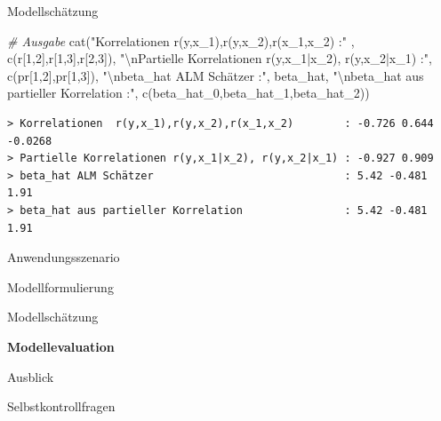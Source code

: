 \documentclass[
  8pt,
  ignorenonframetext,
]{beamer}
\newenvironment{Shaded}{\begin{snugshade}}{\end{snugshade}}
\newcommand{\CommentTok}[1]{\textcolor[rgb]{0.56,0.35,0.01}{\textit{#1}}}
\newcommand{\DecValTok}[1]{\textcolor[rgb]{0.00,0.00,0.81}{#1}}
\newcommand{\FunctionTok}[1]{\textcolor[rgb]{0.00,0.00,0.00}{#1}}
\newcommand{\NormalTok}[1]{#1}
\newcommand{\SpecialCharTok}[1]{\textcolor[rgb]{0.00,0.00,0.00}{#1}}
\newcommand{\StringTok}[1]{\textcolor[rgb]{0.31,0.60,0.02}{#1}}
\begin{document}
\begin{frame}[fragile]{Modellschätzung}
\begin{Shaded}
\begin{Highlighting}[]
\CommentTok{\# Ausgabe}
\FunctionTok{cat}\NormalTok{(}\StringTok{"Korrelationen  r(y,x\_1),r(y,x\_2),r(x\_1,x\_2)        :"}\NormalTok{  , }\FunctionTok{c}\NormalTok{(r[}\DecValTok{1}\NormalTok{,}\DecValTok{2}\NormalTok{],r[}\DecValTok{1}\NormalTok{,}\DecValTok{3}\NormalTok{],r[}\DecValTok{2}\NormalTok{,}\DecValTok{3}\NormalTok{]),}
    \StringTok{"}\SpecialCharTok{\textbackslash{}n}\StringTok{Partielle Korrelationen r(y,x\_1|x\_2), r(y,x\_2|x\_1) :"}\NormalTok{, }\FunctionTok{c}\NormalTok{(pr[}\DecValTok{1}\NormalTok{,}\DecValTok{2}\NormalTok{],pr[}\DecValTok{1}\NormalTok{,}\DecValTok{3}\NormalTok{]),}
    \StringTok{"}\SpecialCharTok{\textbackslash{}n}\StringTok{beta\_hat ALM Schätzer                              :"}\NormalTok{, beta\_hat,}
    \StringTok{"}\SpecialCharTok{\textbackslash{}n}\StringTok{beta\_hat aus partieller Korrelation                :"}\NormalTok{, }\FunctionTok{c}\NormalTok{(beta\_hat\_0,beta\_hat\_1,beta\_hat\_2))}
\end{Highlighting}
\end{Shaded}

\begin{verbatim}
> Korrelationen  r(y,x_1),r(y,x_2),r(x_1,x_2)        : -0.726 0.644 -0.0268 
> Partielle Korrelationen r(y,x_1|x_2), r(y,x_2|x_1) : -0.927 0.909 
> beta_hat ALM Schätzer                              : 5.42 -0.481 1.91 
> beta_hat aus partieller Korrelation                : 5.42 -0.481 1.91
\end{verbatim}
\end{frame}

\begin{frame}{}
\protect\hypertarget{section-7}{}
\large
{}
\vfill

Anwendungsszenario

Modellformulierung

Modellschätzung

\textbf{Modellevaluation}

Ausblick

Selbstkontrollfragen \vfill
\end{frame}
\end{document}
